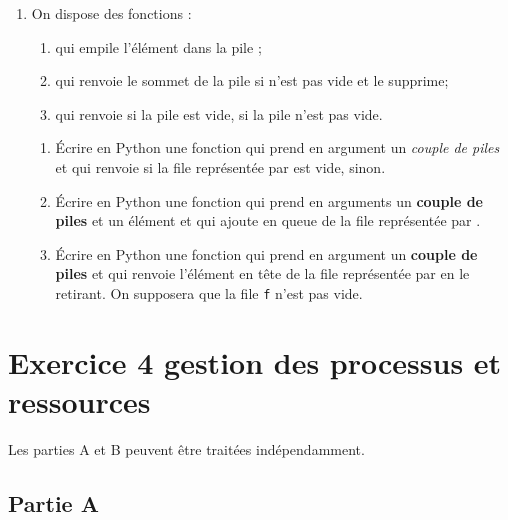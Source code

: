 \documentclass[a4paper,12pt,french]{book}
\begin{document}
\begin{enumerate}[\bfseries 1.]
        \item
        On dispose des fonctions :
        \begin{enumerate}[--]
            \item {} qui empile l'élément  dans la pile ;
            \item {} qui renvoie le sommet de la pile  si  n'est pas vide et le supprime;
            \item {} qui renvoie  si la pile  est vide,  si la pile  n'est pas vide.
        \end{enumerate}

        \begin{enumerate}[\bfseries a.]
            \item Écrire en Python une fonction  qui prend en argument un \textit{couple de piles}  et qui renvoie  si la file représentée par  est vide,  sinon.
            \item  Écrire en Python une fonction  qui prend en arguments un \textbf{couple de piles}  et un élément  et qui ajoute  en queue de la file représentée par .
            \item Écrire en Python une fonction  qui prend en argument un \textbf{couple de piles}  et qui renvoie l'élément en tête de la file représentée par  en le retirant. On supposera que la file \texttt{f} n'est pas vide.
        \end{enumerate}
    \end{enumerate}

\section*{Exercice 4 \small{\hfill gestion des processus et ressources}}

    Les parties A et B peuvent être traitées indépendamment.

    \subsection*{Partie A}
\end{document}
